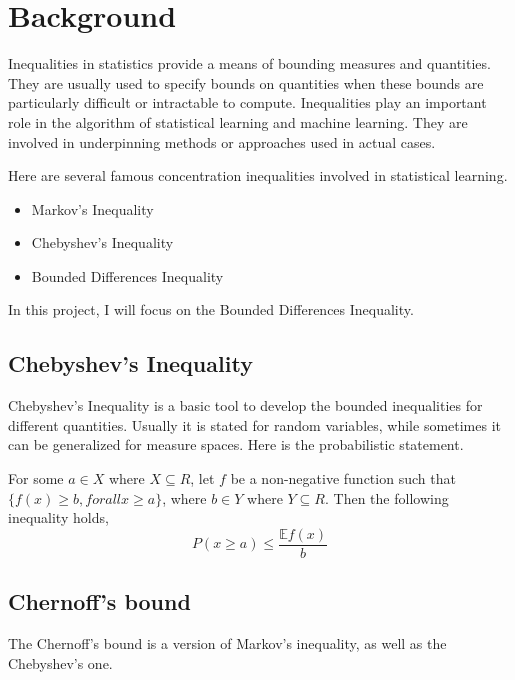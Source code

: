 

\section{Background}

Inequalities in statistics provide a means of bounding measures and quantities. 
They are usually used to specify bounds on quantities when these bounds are particularly difficult or intractable to compute.
Inequalities play an important role in the algorithm of statistical learning and machine learning. 
They are involved in underpinning methods or approaches used in actual cases.

Here are several famous concentration inequalities involved in statistical learning. 
\begin{itemize}
  \item Markov's Inequality
  \item Chebyshev's Inequality 
  \item Bounded Differences Inequality 
\end{itemize}

In this project, I will focus on the Bounded Differences Inequality.

\subsection{Chebyshev's Inequality}
Chebyshev's Inequality is a basic tool to develop the bounded inequalities for different quantities. 
Usually it is stated for random variables, while sometimes it can be generalized for measure spaces.
Here is the probabilistic statement.
\begin{theorem} 
  For some $a \in X$ where $X \subseteq R$, let $f$ be a non-negative function such that
  $\{ f(x) \geq b, for all x \geq a\}$, where $b \in Y$ where $Y \subseteq R$. Then the following inequality holds,
  \begin{equation}
    P(x \geq a) \leq \frac{\mathbb{E}f(x)}{b}
  \end{equation}
\end{theorem}

\subsection{Chernoff's bound}
The Chernoff's bound is a version of Markov's inequality, as well as the Chebyshev's one.

